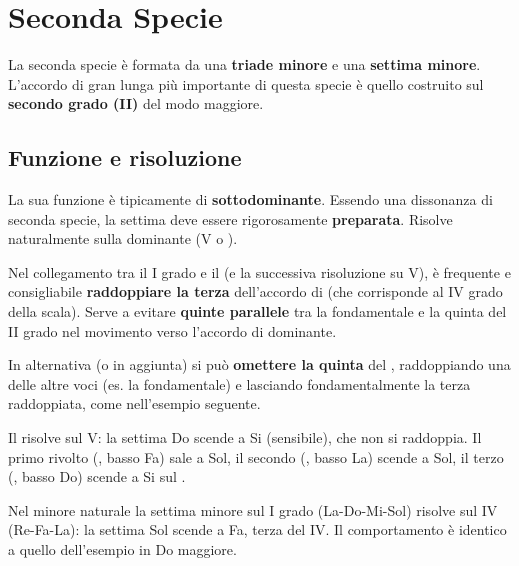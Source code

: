 \section{Seconda Specie}
\label{sec:seconda_specie_dettaglio}

La seconda specie è formata da una \textbf{triade minore} e una \textbf{settima minore}. L'accordo di gran lunga più importante di questa specie è quello costruito sul \textbf{secondo grado (II)} del modo maggiore.

\subsection{Funzione e risoluzione}
La sua funzione è tipicamente di \textbf{sottodominante}. Essendo una dissonanza di seconda specie, la settima deve essere rigorosamente \textbf{preparata}. Risolve naturalmente sulla dominante (V o ).

\begin{regola}
    \label{reg:ii7_raddoppio}
    Nel collegamento tra il I grado e il  (e la successiva risoluzione su V), è frequente e consigliabile \textbf{raddoppiare la terza} dell'accordo di  (che corrisponde al IV grado della scala). Serve a evitare \textbf{quinte parallele} tra la fondamentale e la quinta del II grado nel movimento verso l'accordo di dominante.

	In alternativa (o in aggiunta) si può \textbf{omettere la quinta} del , raddoppiando una delle altre voci (es. la fondamentale) e lasciando fondamentalmente la terza raddoppiata, come nell'esempio seguente.
\end{regola}

\begin{esempio}
    Il  risolve sul V: la settima Do scende a Si (sensibile), che non si raddoppia. Il primo rivolto (, basso Fa) sale a Sol, il secondo (, basso La) scende a Sol, il terzo (, basso Do) scende a Si sul .
\end{esempio}

\begin{esempio}
	\label{ex:i7_minore}
	Nel minore naturale la settima minore sul I grado (La-Do-Mi-Sol) risolve sul IV (Re-Fa-La): la settima Sol scende a Fa, terza del IV. Il comportamento è identico a quello dell'esempio in Do maggiore.
\end{esempio}

